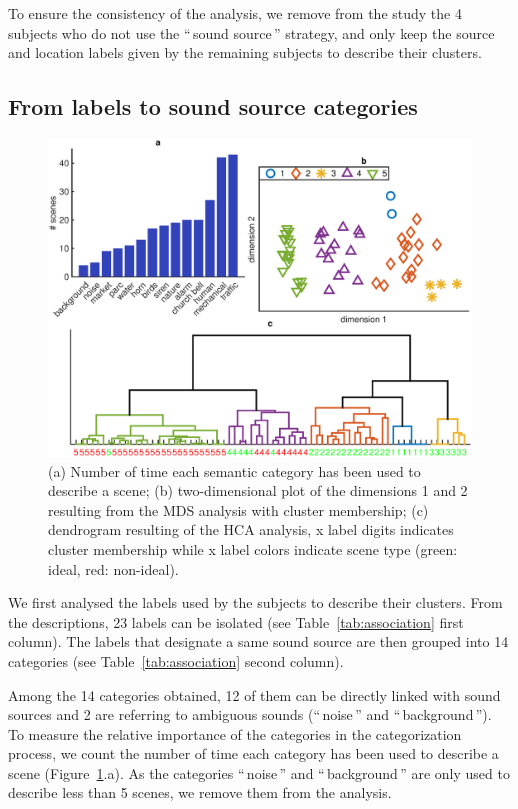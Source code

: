 \documentclass[twoside,twocolumn]{article}
\begin{document}

To ensure the consistency of the analysis, we remove from the study the 4 subjects who do not use the ``\,sound source\,'' strategy, and only keep the source and location labels given by the remaining subjects to describe their clusters. 

\subsection{From labels to sound source categories}
\label{sec:fromLab2Cat}

\begin{figure}[t!]
\centering
\includegraphics[width=.8\paperwidth]{gfxMatlab/xp3_1.eps} 
\caption{\label{fig:xp3_1} (a) Number of time each semantic category has been used to describe a scene; (b) two-dimensional plot of the dimensions 1 and 2 resulting from the MDS analysis with cluster membership; (c) dendrogram resulting of the HCA analysis, x label digits indicates cluster membership while x label colors indicate scene type (green: ideal, red: non-ideal).}
\end{figure}

We first analysed the labels used by the subjects to describe their clusters. From the descriptions, 23 labels can be isolated (see Table~\ref{tab:association} first column). The labels that designate a same sound source are then grouped into 14 categories (see Table~\ref{tab:association} second column).   

Among the 14 categories obtained, 12 of them can be directly linked with sound sources and 2 are referring to ambiguous sounds (``\,noise\,'' and ``\,background\,''). To measure the relative importance of the categories in the categorization process, we count the number of time each category has been used to describe a scene (Figure~\ref{fig:xp3_1}.a). As the categories ``\,noise\,'' and ``\,background\,'' are only used to describe less than 5 scenes, we remove them from the analysis.
\end{document}
